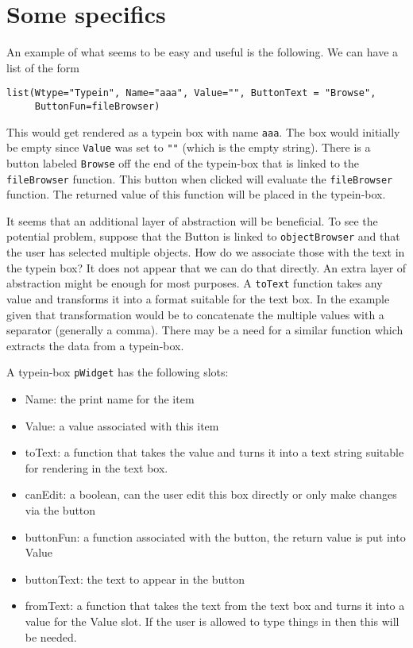 \documentclass{article}
\begin{document}
\section*{Some specifics}

An example of what seems to be easy and useful is the following.
We can have a list of the form
\begin{verbatim}
list(Wtype="Typein", Name="aaa", Value="", ButtonText = "Browse",
     ButtonFun=fileBrowser) 
\end{verbatim}
This would get rendered as a typein box with name \verb+aaa+. The box
would initially be empty since \verb+Value+ was set to \verb+""+
(which is the empty string). There is a button labeled
\verb+Browse+ off the end of the typein-box that is linked to the
\verb+fileBrowser+ function. This button when clicked will evaluate
the \verb+fileBrowser+ function.
The returned value of this function will be placed in the typein-box.

It seems that an additional layer
of abstraction will be beneficial. 
To see the potential problem, suppose that the Button is linked to
\verb+objectBrowser+ and that the user has selected multiple
objects. How do we associate those with the text in the typein box?
It does not appear that we can do that directly. An extra layer of
abstraction might be enough for most purposes. A \verb+toText+
function takes any value and transforms it into a format suitable for
the text box. In the example given that transformation would be to
concatenate the multiple values with a separator (generally a comma).
There may be a need for a similar function which extracts the data
from a typein-box.

A typein-box \verb+pWidget+ has the following slots:
\begin{itemize}
\item Name: the print name for the item
\item Value: a value associated with this item
\item toText: a function that takes the value and turns it into a text
  string suitable for rendering in the text box.
\item canEdit: a boolean, can the user edit this box directly or only
  make changes via the button
\item buttonFun: a function associated with the button, the return
  value is put into Value
\item buttonText: the text to appear in the button
\item fromText: a function that takes the text from the text box and
  turns it into a value for the Value slot. If the user is allowed to
  type things in then this will be needed.
\end{itemize}
\end{document}

